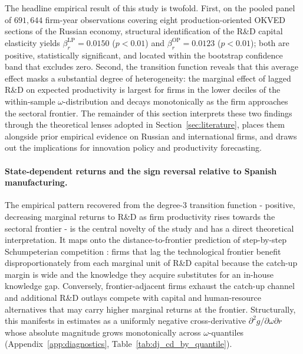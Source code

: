 \documentclass[a4paper, 12pt]{article}
\begin{document}
The headline empirical result of this study is twofold. First, on the pooled panel of $691{,}644$ firm-year observations covering eight production-oriented OKVED sections of the Russian economy, structural identification of the R\&D capital elasticity yields $\beta_r^{\text{LP}} = 0.0150$ ($p<0.01$) and $\beta_r^{\text{OP}} = 0.0123$ ($p<0.01$); both are positive, statistically significant, and located within the bootstrap confidence band that excludes zero. Second, the \textcite{doraszelski2013r} transition function reveals that this average effect masks a substantial degree of heterogeneity: the marginal effect of lagged R\&D on expected productivity is largest for firms in the lower deciles of the within-sample $\omega$-distribution and decays monotonically as the firm approaches the sectoral frontier. The remainder of this section interprets these two findings through the theoretical lenses adopted in Section~\ref{sec:literature}, places them alongside prior empirical evidence on Russian and international firms, and draws out the implications for innovation policy and productivity forecasting.

\paragraph{State-dependent returns and the sign reversal relative to Spanish manufacturing.} The empirical pattern recovered from the degree-3 transition function - positive, decreasing marginal returns to R\&D as firm productivity rises towards the sectoral frontier - is the central novelty of the study and has a direct theoretical interpretation. It maps onto the distance-to-frontier prediction of step-by-step Schumpeterian competition \parencite{aghion1990model}: firms that lag the technological frontier benefit disproportionately from each marginal unit of R\&D capital because the catch-up margin is wide and the knowledge they acquire substitutes for an in-house knowledge gap. Conversely, frontier-adjacent firms exhaust the catch-up channel and additional R\&D outlays compete with capital and human-resource alternatives that may carry higher marginal returns at the frontier. Structurally, this manifests in estimates as a uniformly negative cross-derivative $\partial^2 g/\partial\omega\partial r$ whose absolute magnitude grows monotonically across $\omega$-quantiles (Appendix~\ref{app:diagnostics}, Table~\ref{tab:dj_cd_by_quantile}).
\end{document}
